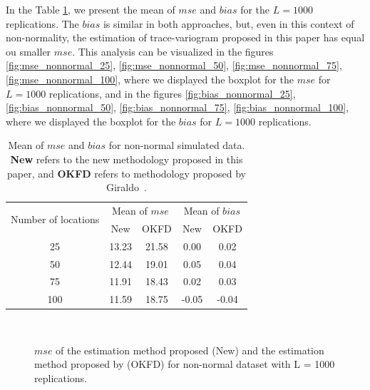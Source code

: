 \documentclass[12pt]{interact}
\theoremstyle{plain}%
\theoremstyle{definition}
\theoremstyle{remark}
\begin{document}
In the Table \ref{tab:summary-nonnormal}, we present the mean of \(mse\) and \(bias\) for the \(L=1000\) replications. The \(bias\) is similar in both approaches, but, even in this context of non-normality, the estimation of trace-variogram proposed in this paper has equal ou smaller \(mse\).
This analysis can be visualized in the figures \ref{fig:mse_nonnormal_25}, \ref{fig:mse_nonnormal_50}, \ref{fig:mse_nonnormal_75}, \ref{fig:mse_nonnormal_100}, where we displayed the boxplot for the \(mse\) for \(L=1000\) replications, and in the figures \ref{fig:bias_nonnormal_25}, \ref{fig:bias_nonnormal_50}, \ref{fig:bias_nonnormal_75}, \ref{fig:bias_nonnormal_100}, where we displayed the boxplot for the \(bias\) for \(L=1000\) replications.

\begin{table}[p]
	\centering
	\caption{Mean of $mse$ and $bias$ for non-normal simulated data. \textbf{New} refers to the new methodology proposed in this paper, and \textbf{OKFD} refers to methodology proposed by Giraldo~\cite{giraldo2011ordinary}.}
	\begin{tabular}{ccc|cc}
		\toprule
		\multirow{2}{*}{Number of locations} & \multicolumn{2}{c}{Mean of $mse$} & \multicolumn{2}{|c}{Mean of $bias$} \\ \cmidrule{2-5}
		& New   & OKFD  & New   & OKFD \\  \midrule
		25    & 13.23 & 21.58 & 0.00  & 0.02 \\
		50    & 12.44 & 19.01 & 0.05  & 0.04 \\
		75    & 11.91 & 18.43 & 0.02  & 0.03 \\
		100   & 11.59 & 18.75 & -0.05 & -0.04 \\ \bottomrule
	\end{tabular}
	\label{tab:summary-nonnormal}
\end{table}

\begin{figure}[p]
	\\
	\caption{$mse$ of the estimation method proposed (New) and the estimation method proposed by \cite{giraldo2011ordinary} (OKFD) for non-normal dataset with L = 1000 replications.}
\end{figure}
\end{document}
